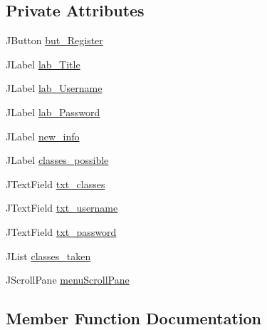 \subsection*{Private Attributes}
\begin{DoxyCompactItemize}
\item 
J\+Button \mbox{\hyperlink{classcom_1_1_b_n_u_1_1pages_1_1register_1_1_register_model_a9c782bc03e4ac8d7789fd5c546b49a1b}{but\+\_\+\+Register}}
\item 
J\+Label \mbox{\hyperlink{classcom_1_1_b_n_u_1_1pages_1_1register_1_1_register_model_a72295777d735789685fe157be1c17e80}{lab\+\_\+\+Title}}
\item 
J\+Label \mbox{\hyperlink{classcom_1_1_b_n_u_1_1pages_1_1register_1_1_register_model_a5e363008f35e3b9465fd1d77f0eda6e0}{lab\+\_\+\+Username}}
\item 
J\+Label \mbox{\hyperlink{classcom_1_1_b_n_u_1_1pages_1_1register_1_1_register_model_abc3cb35cf6ce21e912be075795af002d}{lab\+\_\+\+Password}}
\item 
J\+Label \mbox{\hyperlink{classcom_1_1_b_n_u_1_1pages_1_1register_1_1_register_model_a50fe7b0287bf29bbdd0f304595859ee5}{new\+\_\+info}}
\item 
J\+Label \mbox{\hyperlink{classcom_1_1_b_n_u_1_1pages_1_1register_1_1_register_model_a3014839846b360c2e4f8416fd389c199}{classes\+\_\+possible}}
\item 
J\+Text\+Field \mbox{\hyperlink{classcom_1_1_b_n_u_1_1pages_1_1register_1_1_register_model_ae3507f1c61e56eac0a2bf9191d699e59}{txt\+\_\+classes}}
\item 
J\+Text\+Field \mbox{\hyperlink{classcom_1_1_b_n_u_1_1pages_1_1register_1_1_register_model_a755aa9164c9af26373161e0bd3fead4a}{txt\+\_\+username}}
\item 
J\+Text\+Field \mbox{\hyperlink{classcom_1_1_b_n_u_1_1pages_1_1register_1_1_register_model_a4dd89abb10795ac0a24bbc5ba8965c0d}{txt\+\_\+password}}
\item 
J\+List \mbox{\hyperlink{classcom_1_1_b_n_u_1_1pages_1_1register_1_1_register_model_a6da9d405026c705b1ed50f0c48c50640}{classes\+\_\+taken}}
\item 
J\+Scroll\+Pane \mbox{\hyperlink{classcom_1_1_b_n_u_1_1pages_1_1register_1_1_register_model_a771dc79475d17f67e7dec8c6e2556118}{menu\+Scroll\+Pane}}
\end{DoxyCompactItemize}


\subsection{Member Function Documentation}
\mbox{\label{classcom_1_1_b_n_u_1_1pages_1_1register_1_1_register_model_a169cf8776ea26ac34fc194b727461e67}} 

